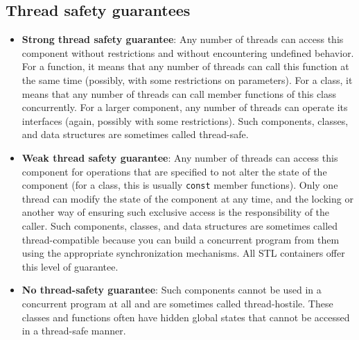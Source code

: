 \subsection{Thread safety guarantees}



\begin{itemize}
\item
  \textbf{Strong thread safety guarantee}: Any number of threads can access this component without restrictions and without encountering undefined behavior. For a function, it means that any number of threads can call this function at the same time (possibly, with some restrictions on parameters). For a class, it means that any number of threads can call member functions of this class concurrently. For a larger component, any number of threads can operate its interfaces (again, possibly with some restrictions). Such components, classes, and data structures are sometimes called thread-safe.
\item
  \textbf{Weak thread safety guarantee}: Any number of threads can access this component for operations that are specified to not alter the state of the component (for a class, this is usually \texttt{const} member functions). Only one thread can modify the state of the component at any time, and the locking or another way of ensuring such exclusive access is the responsibility of the caller. Such components, classes, and data structures are sometimes called thread-compatible because you can build a concurrent program from them using the appropriate synchronization mechanisms. All STL containers offer this level of guarantee.
\item
  \textbf{No thread-safety guarantee}: Such components cannot be used in a concurrent program at all and are sometimes called thread-hostile. These classes and functions often have hidden global states that cannot be accessed in a thread-safe manner.
\end{itemize}

